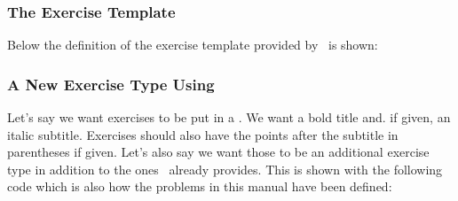\documentclass{xsim-manual}
\begin{document}
\subsubsection{The  Exercise Template}\label{sec:exercise-templ-default}

Below the definition of the  exercise template provided by
\xsim\ is shown:

\begin{sourcecode}
  {}
\end{sourcecode}

\subsubsection{A New Exercise Type Using }
Let's say we want exercises to be put in a . We want a bold
title and. if given, an italic subtitle.  Exercises should also have the
points after the subtitle in parentheses if given.  Let's also say we want
those to be an additional exercise type in addition to the ones \xsim\ already
provides.  This is shown with the following code which is also how the
problems in this manual have been defined:

\begin{sourcecode}
    {%
      \tcolorbox[
        colback = red!5!white ,
        colframe = red!75!black ,
        colbacktitle = yellow!50!red ,
        coltitle = red!25!black ,
        breakable ,
        drop shadow ,
        beforeafter skip = .5\baselineskip ,
        title =
          \textbf{\GetExerciseName~\GetExerciseProperty{counter}}%
          \GetExercisePropertyT{subtitle}{ \textit{\PropertyValue}}%
          \IfInsideSolutionF{%
            \GetExercisePropertyT{points}{ %
              (%
                \printgoal{\PropertyValue}
                \IfExerciseGoalSingularTF{points}
                  {\XSIMtranslate{point}}
                  {\XSIMtranslate{points}}%
              )%
            }%
          }%
      ]%
    }
    {\endtcolorbox}

\end{sourcecode}
\end{document}
